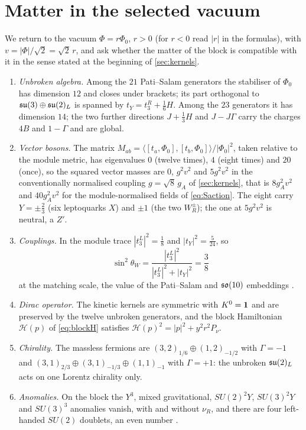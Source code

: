 \section{Matter in the selected vacuum}
\label{sec:matter}

We return to the vacuum $\Phi=r\Phi_0$, $r>0$ (for $r<0$ read $|r|$ in the formulas), with $v=|\Phi|/\sqrt2=\sqrt2\,r$, and ask whether the matter of the block is compatible with
it in the sense stated at the beginning of \cref{sec:kernels}.

\begin{theorem}
\label{thm:compat}
\begin{enumerate}[label=(\alph*),leftmargin=2.2em]
\item \emph{Unbroken algebra.} Among the $21$ Pati--Salam generators the stabiliser of $\Phi_0$ has dimension $12$ and closes under brackets; its part
orthogonal to $\mathfrak{su}(3)\oplus\mathfrak{su}(2)_L$ is spanned by $t_Y=t^R_3+\tfrac16H$. Among the $23$ generators it has dimension $14$; the two further directions $J+\tfrac13H$
and $J-J\Gamma$ carry the charges $4B$ and $1-\Gamma$ and are global.
\item \emph{Vector bosons.} The matrix $M_{ab}=\langle[t_a,\Phi_0],[t_b,\Phi_0]\rangle/|\Phi_0|^2$, taken relative to the module metric, has eigenvalues $0$ (twelve
times), $4$ (eight times) and $20$ (once), so the squared vector masses are $0$, $g^2v^2$ and $5g^2v^2$ in the conventionally normalised coupling $g=\sqrt8\,g_A$ of
\cref{sec:kernels}, that is $8g_A^2v^2$ and $40g_A^2v^2$ for the module-normalised fields of \eqref{eq:Saction}. The eight carry $Y=\pm\tfrac23$ (six leptoquarks
$X$) and $\pm1$ (the two $W_R^\pm$); the one at $5g^2v^2$ is neutral, a $Z'$.
\item \emph{Couplings.} In the module trace $|t^L_3|^2=\tfrac18$ and $|t_Y|^2=\tfrac5{24}$, so
\[
\sin^2\theta_W=\frac{|t^L_3|^2}{|t^L_3|^2+|t_Y|^2}=\frac38
\]
at the matching scale, the value of the Pati--Salam and $\mathfrak{so}(10)$ embeddings \cite{GeorgiQuinnWeinberg74}.
\item \emph{Dirac operator.} The kinetic kernels are symmetric with $K^0=\mathbf 1$ and are preserved by the twelve unbroken generators, and the block Hamiltonian
$\mathcal H(p)$ of \eqref{eq:blockH} satisfies $\mathcal H(p)^2=|p|^2+y^2r^2P_\nu$.
\item \emph{Chirality.} The massless fermions are $(3,2)_{1/6}\oplus(1,2)_{-1/2}$ with $\Gamma=-1$ and $(3,1)_{2/3}\oplus(3,1)_{-1/3}\oplus(1,1)_{-1}$ with $\Gamma=+1$:
the unbroken $\mathfrak{su}(2)_L$ acts on one Lorentz chirality only.
\item \emph{Anomalies.} On the block the $Y^3$, mixed gravitational, $SU(2)^2Y$, $SU(3)^2Y$ and $SU(3)^3$ anomalies vanish, with and without $\nu_R$, and there are
four left-handed $SU(2)$ doublets, an even number \cite{Witten82}.
\end{enumerate}
\end{theorem}

